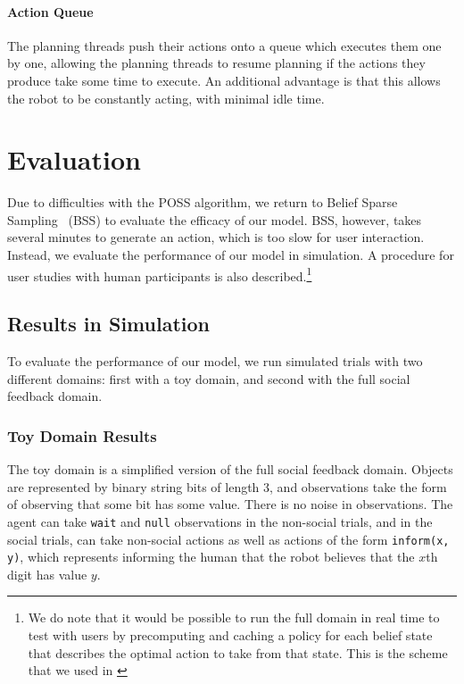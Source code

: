 \documentclass{article}
\begin{document}
\begin{multicols}{2}
\paragraph{Action Queue} The planning threads push their actions onto a queue which executes them one by one, allowing the planning threads to resume planning if the actions they produce take some time to execute. An additional advantage is that this allows the robot to be constantly acting, with minimal idle time. 

\section{Evaluation}

Due to difficulties with the POSS algorithm, we return to Belief Sparse Sampling~\citep{bss} (BSS) to evaluate the efficacy of our model. BSS, however, takes several minutes to generate an action, which is too slow for user interaction. Instead, we evaluate the performance of our model in simulation. A procedure for user studies with human participants is also described.\footnote{We do note that it would be possible to run the full domain in real time to test with users by precomputing and caching a policy for each belief state that describes the optimal action to take from that state. This is the scheme that we used in \cite{socialfeedback}}

\subsection{Results in Simulation}

To evaluate the performance of our model, we run simulated trials with two different domains: first with a toy domain, and second with the full social feedback domain. 
\subsubsection{Toy Domain Results}

The toy domain is a simplified version of the full social feedback domain. Objects are represented by binary string bits of length 3, and observations take the form of observing that some bit has some value. There is no noise in observations. The agent can take \texttt{wait} and \texttt{null} observations in the non-social trials, and in the social trials, can take non-social actions as well as actions of the form \texttt{inform(x, y)}, which represents informing the human that the robot believes that the $x$th digit has value $y$. 


\end{multicols}
\end{document}

